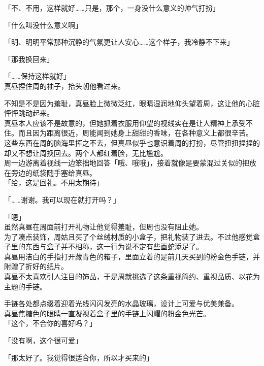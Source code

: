 「不、不用，这样就好……只是，那个，一身没什么意义的帅气打扮」

「什么叫没什么意义啊」

「明、明明平常那种沉静的气氛更让人安心……这个样子，我冷静不下来」

「那我换回来」

「……保持这样就好」\\

真昼捏住周的袖子，抬头朝他看过来。

不知是不是因为羞耻，真昼脸上微微泛红，眼睛湿润地仰头望着周，这让他的心脏怦怦跳动起来。\\

真昼本人应该不是故意的，但她抓着衣服用仰望的视线实在是让人精神上承受不住。而且因为距离很近，周能闻到她身上甜甜的香味，在各种意义上都很辛苦。\\

这些东西在周的脑海里挥之不去，但真昼似乎也意识着周的打扮，尽管扭扭捏捏的却又不想让周换回去。两个人都红着脸，无比尴尬。\\

周一边游离着视线一边笨拙地回答「哦、哦哦」，接着就像是要蒙混过关似的把放在旁边的纸袋随手塞给真昼。\\

「给，这是回礼。不用太期待」

「……谢谢。我可以现在就打开吗？」

「嗯」\\

虽然真昼在周面前打开礼物让他觉得羞耻，但周也没有阻止她。\\

为了凑点装饰，周姑且买了个丝绒材质的小盒子，把礼物装了进去。不过他感觉盒子里的东西与盒子并不相称，这一行为说不定有些画蛇添足了。\\

真昼用洁白的手指打开藏青色的箱子，里面立着的是前几天买到的粉金色手链，并附赠了折好的纸片。\\

真昼不太喜欢引人注目的饰品，于是周就挑选了这条重视简约、重视品质、以花为主题的手链。

手链各处都点缀着迎着光线闪闪发亮的水晶玻璃，设计上可爱与优美兼备。\\

真昼焦糖色的眼睛一直凝视着盒子里的手链上闪耀的粉金色光芒。\\

「这个，不合你的喜好吗？」

「没有啊，这个很可爱」

「那太好了。我觉得很适合你，所以才买来的」

